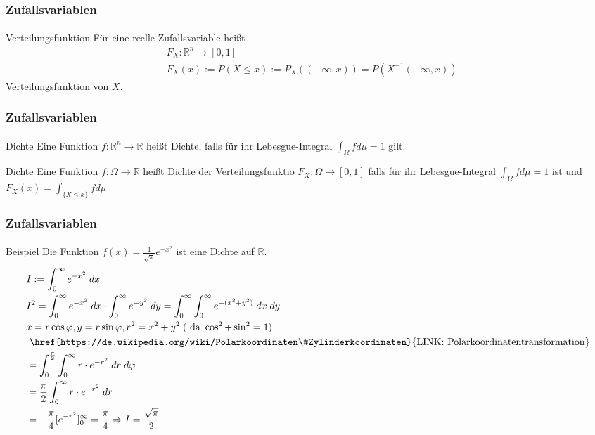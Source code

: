 \documentclass{beamer}
\begin{document}
\begin{frame}
    \frametitle{Zufallsvariablen}
\framesubtitle{}

\begin{block}{Verteilungsfunktion}
Für eine reelle Zufallsvariable heißt 
\begin{align*} 
& F_X : \mathbb{R}^n \to [0,1] \\
& F_X (x) := P (X \leq x) := P_X (( -\infty, x )) = P(X^{-1} (-\infty, x))
\end{align*}
Verteilungsfunktion von $X$.
\end{block}
 \end{frame}

\begin{frame}
    \frametitle{Zufallsvariablen}
\framesubtitle{}

\begin{block}{Dichte}
 Eine Funktion $f:\mathbb{R}^n \to \mathbb{R}$ heißt Dichte, falls für ihr Lebesgue-Integral $\int_{\Omega} f d \mu = 1$ gilt.
\end{block}
\begin{block}{Dichte}
 Eine  Funktion $f:\Omega \to \mathbb{R}$ heißt Dichte der  Verteilungsfunktio $F_X : \Omega \to [0,1]$ falls für ihr Lebesgue-Integral $\int_{\Omega} f d \mu = 1$ ist und 
$F_X (x) = \int_{\{X \leq x \}} f d \mu$
\end{block}
 \end{frame}

\begin{frame}
    \frametitle{Zufallsvariablen}
\framesubtitle{}
\begin{block}{Beispiel}
Die Funktion $f(x) = \frac{1}{\sqrt{\pi}} e^{- x^2}$ ist eine Dichte auf $ \mathbb{R}$.
\begin{align*}
& I := \int_{0}^{\infty} e^{-x^2} \; dx\\
& I^2 =  \int_{0}^{\infty} e^{-x^2} \; dx \cdot    \int_{0}^{\infty} e^{-y^2} \; dy =    \int_{0}^{\infty} \int_{0}^{\infty} e^{-(x^2+y^2)} \; dx \;dy \\
&x=r \cos \varphi ,y=r\sin \varphi ,r^2 = x^2 + y^2  \; (\text{ da } \cos^2 + \sin^2 = 1)\\
 &\text{ \href{https://de.wikipedia.org/wiki/Polarkoordinaten\#Zylinderkoordinaten}{LINK: Polarkoordinatentransformation}} \\
& = \int_{0}^{\frac{\pi}{2}}  \int_{0}^{\infty}r \cdot e^{-r^2} \; dr \;d\varphi \\
&= \frac{\pi}{2} \int_{0}^{\infty}r \cdot e^{-r^2} \; dr \\
&= -\frac{\pi}{4} [e^{-r^2} ]_0^{\infty} = \frac{\pi}{4} \Rightarrow I = \frac{\sqrt{\pi}}{2}
\end{align*}
\end{block}
 \end{frame}
\end{document}
